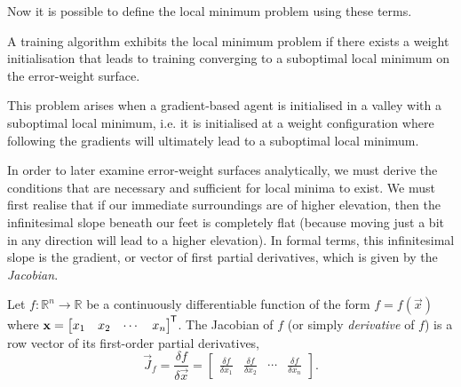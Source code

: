 Now it is possible to define the local minimum problem using these terms.
\begin{problem}
    A training algorithm exhibits the local minimum problem if there exists a weight initialisation that leads to training converging to a suboptimal local minimum on the error-weight surface.

    This problem arises when a gradient-based agent is initialised in a valley with a suboptimal local minimum, i.e. it is initialised at a weight configuration where following the gradients will ultimately lead to a suboptimal local minimum.
\end{problem}

In order to later examine error-weight surfaces analytically, we must derive the conditions that are necessary and sufficient for local minima to exist.
We must first realise that if our immediate surroundings are of higher elevation, then the infinitesimal slope beneath our feet is completely flat (because moving just a bit in any direction will lead to a higher elevation). 
In formal terms, this infinitesimal slope is the gradient, or vector of first partial derivatives, which is given by the \textit{Jacobian}.
\begin{definition}[Jacobian]
    Let $f: \mathbb{R}^n \rightarrow \mathbb{R}$ be a continuously differentiable function of the form
    $f=f\left(\vec{x}\right)$
    where
    $\mathbf{x} = \begin{bmatrix}
        x_1 & x_2 & \cdots & x_n
    \end{bmatrix}^{\mkern-1.5mu\mathsf{T}}$.
    The Jacobian of $f$ (or simply \textit{derivative} of $f$) is a row vector of its first-order partial derivatives,
    \begin{equation*}
        \vec{J}_f
        = \frac{\delta f}{\delta \vec{x}}
        = \begin{bmatrix}
            \frac{\delta f}{\delta x_1} &
            \frac{\delta f}{\delta x_2} &
            \cdots &
            \frac{\delta f}{\delta x_n}
        \end{bmatrix}.
    \end{equation*}
\end{definition}

